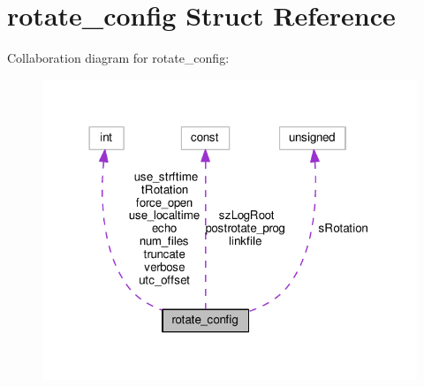 \hypertarget{structrotate__config}{}\section{rotate\+\_\+config Struct Reference}
\label{structrotate__config}


Collaboration diagram for rotate\+\_\+config\+:
\nopagebreak
\begin{figure}[H]
\begin{center}
\leavevmode
\includegraphics[width=318pt]{structrotate__config__coll__graph}
\end{center}
\end{figure}
